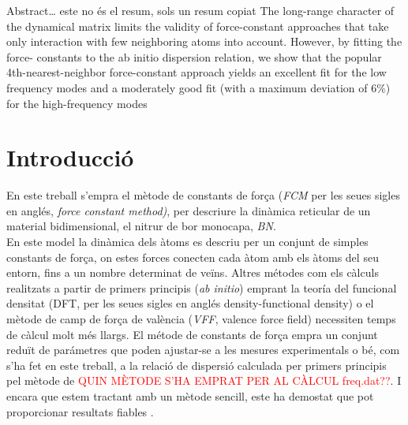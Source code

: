 \documentclass[12pt]{article} %
\begin{document}
\begin{otherlanguage}{english}\itshape

\noindent Abstract\ldots
este no és el resum, sols un resum copiat
The long-range character of the dynamical matrix limits the validity of
force-constant approaches that take only interaction with few neighboring atoms into account. However, by fitting the force-
constants to the ab initio dispersion relation, we show that the popular 4th-nearest-neighbor force-constant approach yields an
excellent fit for the low frequency modes and a moderately good fit (with a 
maximum deviation of $6 \%$) for the high-frequency modes \cite{wirtz04_phonon_disper_graph_revis}
\end{otherlanguage}



\section{Introducció}

En este treball s'empra el mètode de constants de força (\emph{FCM} per les seues sigles en anglés, \emph{\foreignlanguage{english}{force constant method})}, per descriure la dinàmica reticular de un material bidimensional, el nitrur de bor monocapa, \emph{BN}.\\

En este model la dinàmica dels àtoms es descriu per un conjunt de simples constants de força, on estes forces conecten cada àtom amb els àtoms del seu entorn, fins a un nombre determinat de veïns. Altres métodes com els càlculs realitzats a partir de primers principis (\emph{ab initio}) emprant la teoría del funcional densitat (DFT, per les seues sigles en anglés \foreignlanguage{english}{density-functional density}) o el mètode de camp de força de valència (\emph{VFF}, \foreignlanguage{english}{valence force field}) necessiten temps de càlcul molt més llargs. El métode de constants de força empra un conjunt reduït de parámetres que poden ajustar-se a les mesures experimentals o bé, com s'ha fet en este treball, a la relació de dispersió calculada per primers principis pel mètode de \textcolor{red}{QUIN MÈTODE S'HA EMPRAT PER AL CÀLCUL freq.dat??}.  I encara que estem tractant amb un mètode sencill, este ha demostat que pot proporcionar resultats fiables \cite{wirtz04_phonon_disper_graph_revis}.
\end{document}
